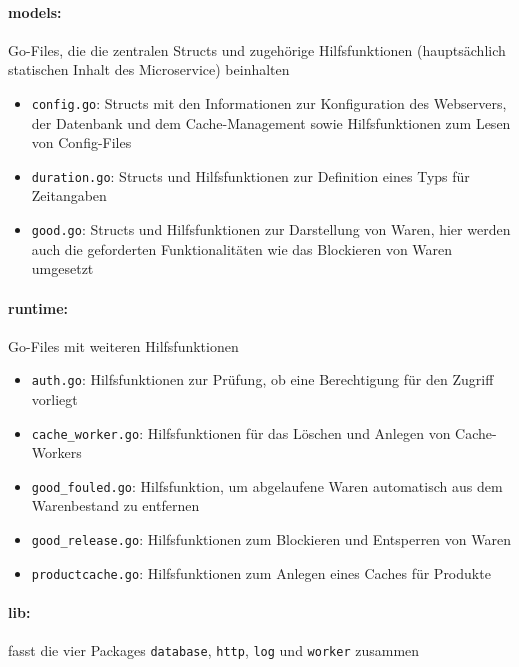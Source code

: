 \paragraph{models:} Go-Files, die die zentralen Structs und zugehörige Hilfsfunktionen (hauptsächlich statischen Inhalt des Microservice) beinhalten
	\begin{itemize}
	\item \texttt{config.go}: Structs mit den Informationen zur Konfiguration des Webservers, der Datenbank und dem Cache-Management sowie Hilfsfunktionen zum Lesen von Config-Files
	\item \texttt{duration.go}: Structs und Hilfsfunktionen zur Definition eines Typs für Zeitangaben
	\item \texttt{good.go}: Structs und Hilfsfunktionen zur Darstellung von Waren, hier werden auch die geforderten Funktionalitäten wie das Blockieren von Waren umgesetzt
	\end{itemize}


\paragraph{runtime:} Go-Files mit weiteren Hilfsfunktionen
	\begin{itemize}
	\item \texttt{auth.go}: Hilfsfunktionen zur Prüfung, ob eine Berechtigung für den Zugriff vorliegt
	\item \texttt{cache\_worker.go}: Hilfsfunktionen für das Löschen und Anlegen von Cache-Workers
	\item \texttt{good\_fouled.go}: Hilfsfunktion, um abgelaufene Waren automatisch aus dem Warenbestand zu entfernen
	\item \texttt{good\_release.go}: Hilfsfunktionen zum Blockieren und Entsperren von Waren
	\item \texttt{productcache.go}: Hilfsfunktionen zum Anlegen eines Caches für Produkte
	\end{itemize}



\newpage
\paragraph{lib:} fasst die vier Packages \texttt{database}, \texttt{http}, \texttt{log} und \texttt{worker} zusammen

